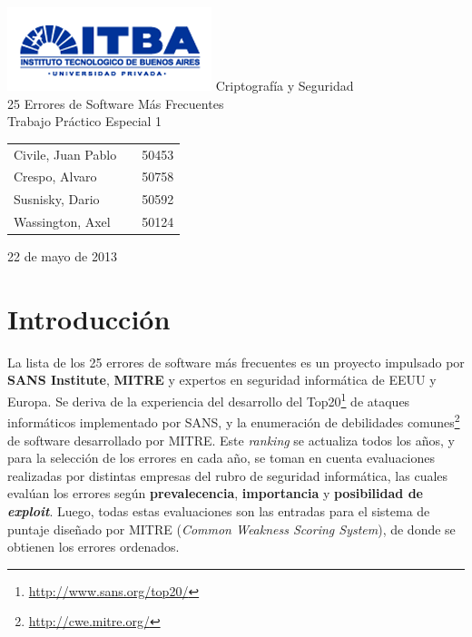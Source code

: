 \documentclass[a4paper,10pt]{article}
\begin{document}
\setcounter{secnumdepth}{5}
\setcounter{tocdepth}{5}

\begin{titlepage}
        \vfill
        \thispagestyle{empty}
        \begin{center}
                \includegraphics{./images/itba_logo.png}
                \vfill
                \Huge{Criptografía y Seguridad}\\
                \vspace{1cm}
                \Huge{25 Errores de Software Más Frecuentes}\\
                \vspace{1cm}
                \Huge{Trabajo Pr\'actico Especial 1}\\
        \end{center}
        \vfill
        \large{
        \begin{tabular}{lcr}
                Civile, Juan Pablo && 50453\\
                Crespo, Alvaro && 50758 \\
                Susnisky, Dario && 50592\\
                Wassington, Axel && 50124\\
        \end{tabular}
}
        \vspace{2cm}
        \begin{center}
                \large{22 de mayo de 2013}\\
        \end{center}
\end{titlepage}
\newpage

\setcounter{page}{1}

\section{Introducción}
La lista de los 25 errores de software más frecuentes es un proyecto impulsado por \textbf{SANS Institute}, \textbf{MITRE} y expertos en seguridad informática de EEUU 
y Europa. Se deriva de la experiencia del desarrollo del Top20\footnote{\url{http://www.sans.org/top20/}} de ataques informáticos
implementado por SANS, y la enumeración de debilidades comunes\footnote{\url{http://cwe.mitre.org/}} de software 
desarrollado por MITRE. Este \emph{ranking} se actualiza todos los años, y para la selección de los errores en cada año,
se toman en cuenta evaluaciones realizadas por distintas empresas del rubro de seguridad informática, las cuales evalúan
los errores según \textbf{prevalecencia}, \textbf{importancia} y \textbf{posibilidad de \emph{exploit}}. Luego, todas estas
evaluaciones son las entradas para el sistema de puntaje diseñado por MITRE (\emph{Common Weakness Scoring System}), de donde se obtienen los
errores ordenados.\\
 
\end{document}
